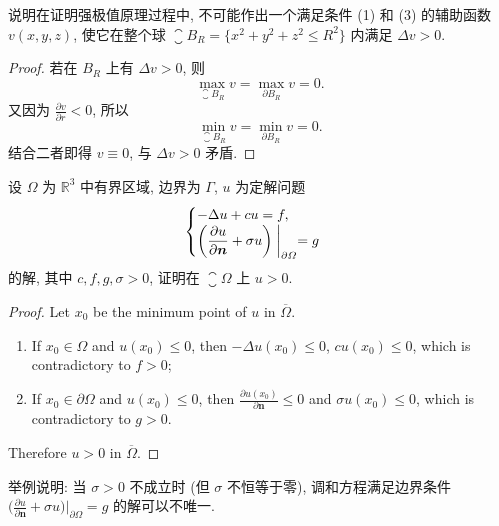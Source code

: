 \begin{exercise}
  说明在证明强极值原理过程中, 不可能作出一个满足条件 (1) 和 (3) 的辅助函数 $v(x,y,z)$,
  使它在整个球 $\closure{B}_R = \{x^2+y^2+z^2 \leq R^2\}$ 内满足 $\Delta v>0$.
\end{exercise}

\begin{proof}
  若在 $B_R$ 上有 $\Delta v>0$, 则
  \[\max_{\closure{B}_R} v = \max_{\partial B_R} v = 0.\]
  又因为 $\frac{\partial v}{\partial r} < 0$, 所以
  \[\min_{\closure{B}_R} v = \min_{\partial B_R} v = 0.\]
  结合二者即得 $v\equiv 0$, 与 $\Delta v>0$ 矛盾.
\end{proof}


\begin{exercise}
  设 $\varOmega$ 为 $\mathbb{R}^3$ 中有界区域, 边界为 $\varGamma$, $u$ 为定解问题
  \[\begin{cases}
    - \Delta u + cu = f, \\
    \displaystyle\biggl(\frac{\partial u}{\partial \bm{n}} + \sigma u\biggr)\biggm|_{\partial\varOmega} = g
  \end{cases}\]
  的解, 其中 $c,f,g,\sigma>0$, 证明在 $\closure{\varOmega}$ 上 $u>0$.
\end{exercise}

\begin{proof}
  Let $x_0$ be the minimum point of $u$ in $\overline{\varOmega}$.
  \begin{enumerate}[(1)]
    \item If $x_0\in\varOmega$ and $u(x_0)\leq 0$, then $-\Delta u(x_0)\leq 0$, $cu(x_0)\leq 0$,
      which is contradictory to $f>0$;
    \item If $x_0\in\partial\varOmega$ and $u(x_0)\leq 0$,
      then $\frac{\partial u(x_0)}{\partial\bm{n}}\leq 0$ and $\sigma u(x_0)\leq 0$,
      which is contradictory to $g>0$.
  \end{enumerate}
  Therefore $u>0$ in $\overline{\varOmega}$.
\end{proof}


\begin{exercise}
  举例说明: 当 $\sigma>0$ 不成立时 (但 $\sigma$ 不恒等于零), 调和方程满足边界条件
  $\bigl(\frac{\partial u}{\partial\bm{n}}+\sigma u\bigr)\big|_{\partial\varOmega}=g$
  的解可以不唯一.
\end{exercise}

